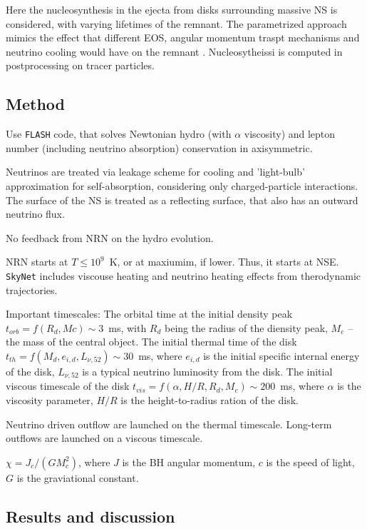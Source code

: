 Here the nucleosynthesis in the ejecta from disks surrounding massive NS is considered, with varying lifetimes of the remnant. The parametrized approach mimics the effect that different EOS, angular momentum traspt mechanisms and neutrino cooling would have on the remnant \cite{(e.g., Paschalidis et al., 2012; Kaplan et al., 2014).}. Nucleosytheissi is computed in postprocessing on tracer particles. 


\subsection{Method}

Use \texttt{FLASH} code, that solves Newtonian hydro (with $\alpha$ viscosity) and lepton number (including neutrino absorption) conservation in axisymmetric. 

Neutrinos are treated via leakage scheme for cooling and 'light-bulb' approximation for self-absorption, considering only charged-particle interactions. The surface of the \ac{NS} is treated as a reflecting surface, that also has an outward neutrino flux.

No feedback from \ac{NRN} on the hydro evolution. 

\ac{NRN} starts at $T\leq 10^9$~K, or at maxiumim, if lower. Thus, it starts at \ac{NSE}. \texttt{SkyNet} includes viscouse heating and neutrino heating effects from therodynamic trajectories. 

Important timescales:
The orbital time at the initial density peak $t_{orb}=f(R_d, Mc)\sim3$~ms, with $R_d$ being the radius of the diensity peak, $M_c$ -- the mass of the central object. 
The initial thermal time of the disk $t_{th}=f(M_d, e_{i,d}, L_{\nu,52})\sim30$~ms, where $e_{i,d}$ is the initial specific internal energy of the disk, $L_{\nu,52}$ is a typical neutrino luminosity from the disk.
The initial viscous timescale of the disk $t_{vis}=f(\alpha, H/R, R_d, M_c)\sim200$~ms, where
$\alpha$ is the viscosity parameter, $H/R$ is the height-to-radius ration of the disk.

Neutrino driven outflow are launched on the thermal timescale. Long-term outflows are launched on a viscous timescale. 

 $\chi = J_c / (G M_c ^2)$, where $J$ is the BH angular momentum, $c$ is the speed of light, $G$ is the graviational constant. 


\subsection{Results and discussion}

